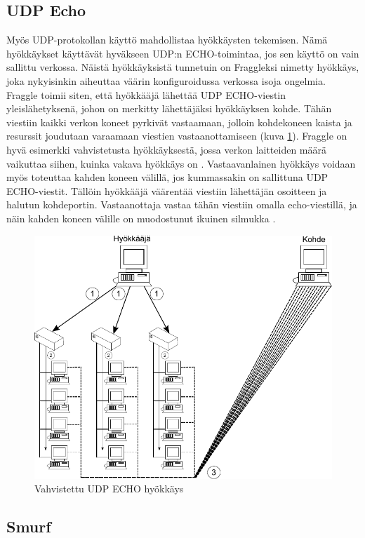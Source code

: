 \subsection{UDP Echo}

Myös UDP-protokollan käyttö mahdollistaa hyökkäysten tekemisen. Nämä
hyökkäykset käyt\-tä\-vät hyväkseen UDP:n ECHO-toimintaa, jos sen käyttö
on vain sallittu verkossa. Näistä hyökkäyksistä tunnetuin on Fraggleksi
nimetty hyökkäys, joka nykyisinkin aiheuttaa väärin konfiguroidussa verkossa isoja ongelmia.
Fraggle toimii siten, että hyökkääjä lähettää UDP ECHO-viestin yleislähetyksenä, johon on merkitty lähettäjäksi
hyökkäyksen kohde. Tähän viestiin kaikki verkon koneet pyrkivät vastaamaan,
jolloin kohdekoneen kaista ja resurssit joudutaan varaamaan viestien vastaanottamiseen (kuva \ref{fraggle}). 
Fraggle on hyvä esimerkki vahvistetusta hyökkäyksestä, jossa verkon laitteiden määrä
vaikuttaa siihen, kuinka vakava hyökkäys on \cite{WEBS}. Vastaavanlainen
hyökkäys voidaan myös toteuttaa kahden koneen välillä, jos kummassakin
on sallittuna UDP ECHO-viestit. Tällöin hyökkääjä väärentää viestiin
lähettäjän osoitteen ja halutun kohdeportin. Vastaanottaja vastaa
tähän viestiin omalla echo-viestillä, ja näin kahden koneen välille on
muodostunut ikuinen silmukka \cite{TCP}.
\newpage
\begin{figure}[htp]
\centering
\includegraphics[width=12cm]{pics/fraggle.pdf}
\caption{Vahvistettu UDP ECHO hyökkäys}
\label{fraggle}
\end{figure}

\subsection{Smurf}


